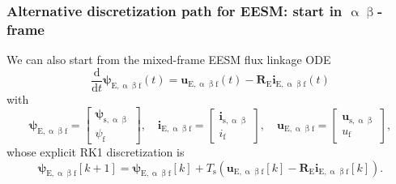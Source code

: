\begin{frame}
    \frametitle{Alternative discretization path for EESM: start in $\upalpha\upbeta$-frame}
    We can also start from the mixed-frame EESM flux linkage ODE
    \begin{equation*}
        \frac{\mathrm{d}}{\mathrm{d}t}\bm{\psi}_{\mathrm{E},\upalpha\upbeta \mathrm{f}}(t) = \bm{u}_{\mathrm{E},\upalpha\upbeta \mathrm{f}}(t) - \bm{R}_\mathrm{E}\bm{i}_{\mathrm{E},\upalpha\upbeta \mathrm{f}}(t)
    \end{equation*}\pause%
    with
    \begin{equation*}
        \bm{\psi}_{\mathrm{E},\upalpha\upbeta \mathrm{f}} = \begin{bmatrix}
            \bm{\psi}_{\mathrm{s},\upalpha\upbeta} \\
            \psi_\mathrm{f}
        \end{bmatrix}, \quad
        \bm{i}_{\mathrm{E},\upalpha\upbeta \mathrm{f}} = \begin{bmatrix}
            \bm{i}_{\mathrm{s},\upalpha\upbeta} \\
            i_\mathrm{f}
        \end{bmatrix}, \quad
        \bm{u}_{\mathrm{E},\upalpha\upbeta \mathrm{f}} = \begin{bmatrix}
            \bm{u}_{\mathrm{s},\upalpha\upbeta} \\
            u_\mathrm{f}
        \end{bmatrix},
    \end{equation*}\pause%
    whose explicit RK1 discretization is
    \begin{equation}
        \bm{\psi}_{\mathrm{E},\upalpha\upbeta \mathrm{f}}[k+1] = \bm{\psi}_{\mathrm{E},\upalpha\upbeta \mathrm{f}}[k] + T_\mathrm{s}\left(\bm{u}_{\mathrm{E},\upalpha\upbeta \mathrm{f}}[k] - \bm{R}_\mathrm{E}\bm{i}_{\mathrm{E},\upalpha\upbeta \mathrm{f}}[k]\right).
    \end{equation}
\end{frame}

